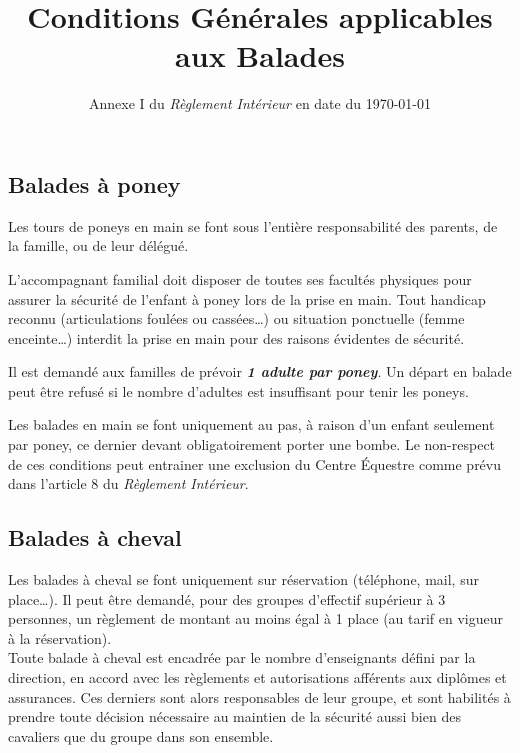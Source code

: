 \documentclass[11pt,a4paper]{article}
\title[Conditions Générales applicables aux Balades \\ version du \today]{Conditions Générales applicables aux Balades}
\subtitle{Annexe I du \textit{Règlement Intérieur} en date du \today}
\author{}
\date{}
\renewcommand{\emph}[1]{\textit{\textbf{#1}}}
\begin{document}
   \maketitle


   \subsection*{Balades à poney}
      Les tours de poneys en main se font sous l'entière responsabilité des parents, de la famille, ou de leur délégué.

      L'accompagnant familial doit disposer de toutes ses facultés physiques pour assurer la sécurité de l'enfant à poney lors de la prise en main.
      Tout handicap reconnu (articulations foulées ou cassées\dots) ou situation ponctuelle (femme enceinte\dots) interdit la prise en main pour des raisons évidentes de sécurité.

      Il est demandé aux familles de prévoir \emph{1 adulte par poney}.
      Un départ en balade peut être refusé si le nombre d'adultes est insuffisant pour tenir les poneys.

      Les balades en main se font uniquement au pas, à raison d'un enfant seulement par poney, ce dernier devant obligatoirement porter une bombe.
      Le non-respect de ces conditions peut entrainer une exclusion du Centre Équestre comme prévu dans l'article 8 du \textit{Règlement Intérieur}.

   \subsection*{Balades à cheval}
      Les balades à cheval se font uniquement sur réservation (téléphone, mail, sur place\dots).
      Il peut être demandé, pour des groupes d'effectif supérieur à 3 personnes, un règlement de montant au moins égal à 1 place (au tarif en vigueur à la réservation).
      \\

      Toute balade à cheval est encadrée par le nombre d'enseignants défini par la direction, en accord avec les règlements et autorisations afférents aux diplômes et assurances.
      Ces derniers sont alors responsables de leur groupe, et sont habilités à prendre toute décision nécessaire au maintien de la sécurité aussi bien des cavaliers que du groupe dans son ensemble.
      \\
\end{document}
